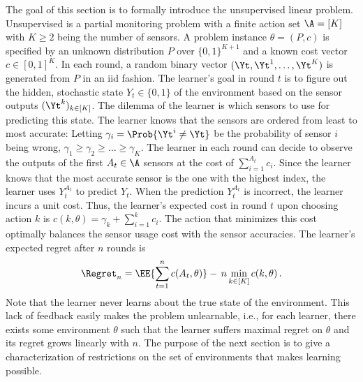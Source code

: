 The goal of this section is to formally introduce the unsupervised linear \ses problem.
Unsupervised \ses is a partial monitoring problem with a finite action set $\A = [K]$
with $K\ge 2$ being the number of sensors.
A problem instance $\theta = (P,c)$ is specified by an unknown distribution $P$ over 
$\{0,1\}^{K+1}$ and a known cost vector $c\in [0,1]^K$.
In each round, a random binary vector $(\Yt,\Yt^1,\dots,\Yt^K)$ is generated from $P$ in an iid fashion.
The learner's goal in round $t$ is to figure out 
the hidden, stochastic state $Y_t\in \{0,1\}$ of the environment based on the sensor outputs $(\Yt^{k})_{k\in [K]}$.
The dilemma of the learner is which sensors to use for predicting this state.
The learner knows that the sensors are ordered from least to most accurate:
Letting $\gamma_i  =\Prob{\Yt^{i}\ne \Yt}$ be the probability of sensor $i$ being wrong,
$\gamma_1\ge \gamma_2 \ge \dots \ge \gamma_K$.
The learner in each round can decide to observe the outputs of the first $A_t\in \A$ sensors
at the cost of $\sum_{i=1}^{A_t} c_i$.
Since the learner knows that the most accurate sensor is the one with the highest index,
the learner uses $Y_t^{A_t}$ to predict $Y_t$.
When the prediction $Y_t^{A_t}$ is incorrect, the learner incurs a unit cost. 
Thus, the learner's expected cost in round $t$ upon choosing action $k$ is
$c(k,\theta) = \gamma_k+\sum_{i=1}^k c_i$.
The action that minimizes this cost optimally balances the sensor usage cost with the sensor accuracies.
The learner's expected regret after $n$ rounds is 
\begin{align*}
\Regret_n = \EE{\sum_{t=1}^n c(A_t,\theta)} -\, n \min_{k\in [K]} c(k,\theta)\,.
\end{align*}
Note that the learner never learns about the true state of the environment. 
This lack of feedback easily makes the problem unlearnable, i.e., 
for each learner, there exists some environment $\theta$ such that the learner suffers
maximal regret on $\theta$ and its regret grows linearly with $n$.
The purpose of the next section is to give a characterization of restrictions on the set of environments
that makes learning possible.


